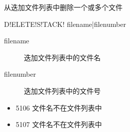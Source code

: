\label{sss:deletestack}

从迭加文件列表中删除一个或多个文件

\begin{SACSTX}
    D!ELETE!S!TACK! filename|filenumber
\end{SACSTX}

\begin{description}
\item [filename] 迭加文件列表中的文件名
\item [filenumber] 迭加文件列表中的文件号
\end{description}

\begin{itemize}
\item 5106 文件名不在文件列表中
\item 5107 文件名不在文件列表中
\end{itemize}

